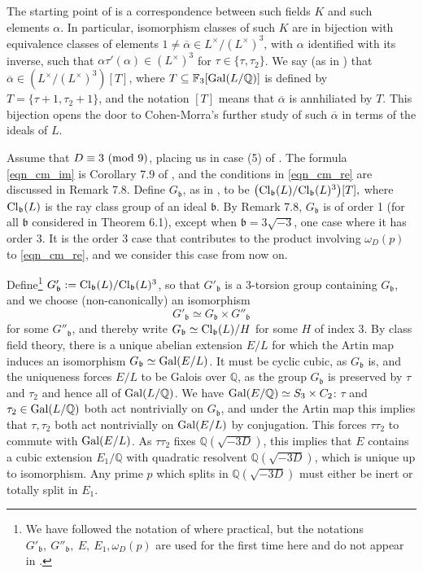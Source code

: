 \documentclass[12pt]{amsart}
\theoremstyle{remark}
\numberwithin{theorem}{section} \numberwithin{equation}{section}
\newcommand{\mfb}{\mathfrak{b}}
\newcommand{\F}{\mathbb{F}}
\newcommand{\Cl}{{\text {\rm Cl}}}
\newcommand{\Q}{\mathbb{Q}}
\newcommand{\textmod}{{\text {\rm mod}}}
\newcommand{\Gal}{{\text {\rm Gal}}}
\begin{document}
The starting point of \cite{CM}
is a correspondence between such fields $K$ and such elements $\alpha$.
In particular, isomorphism classes of such $K$ are in bijection with equivalence classes of elements $1 \neq \overline{\alpha} \in L^{\times}/(L^{\times})^3$,
with $\alpha$ identified with its inverse,
such that $\alpha \tau'(\alpha) \in (L^{\times})^3$ for $\tau \in \{ \tau, \tau_2 \}$. 
We say (as in \cite[Definition 2.3]{CM}) that $\overline{\alpha} \in (L^{\times}/(L^{\times})^3)[T]$, where
$T \subseteq \F_3[\Gal(L/\Q)]$ is defined by $T = \{ \tau + 1, \tau_2 + 1 \}$, and the notation $[T]$ means
that $\overline{\alpha}$ is annhiliated by $T$. This bijection opens the door to Cohen-Morra's
further study of such $\overline{\alpha}$ in terms of the ideals of $L$.

Assume that $D \equiv 3 \ (\textmod \ 9)$, placing us in case (5) of \cite[p. 464]{CM}. The 
formula \eqref{eqn_cm_im} is Corollary 7.9 of \cite{CM}, and the conditions in \eqref{eqn_cm_re} are discussed in
Remark 7.8. Define $G_{\mfb}$, as in \cite[Theorem 6.1]{CM}, to be
$\big(\Cl_{\mfb}(L)/\Cl_{\mfb}(L)^3\big)[T],$ where $\Cl_{\mfb}(L)$ is the ray class group of an ideal $\mfb$.
By Remark 7.8, $G_{\mfb}$ is of order 1 (for all $\mfb$ considered in Theorem 6.1), except when $\mfb = 3\sqrt{-3}$, 
one case where it has order 3. 
It is the order 3 case that contributes to the product involving $\omega_D(p)$ to \eqref{eqn_cm_re}, and we consider
this case from now on.

Define\footnote{We have followed the notation of \cite{CM} where practical, but the notations
$G'_{\mfb}, \ G''_{\mfb}, \ E, \ E_1, \omega_D(p)$ are used for the first time here and do not
appear in \cite{CM}.} $G'_{\mfb} := \Cl_{\mfb}(L)/\Cl_{\mfb}(L)^3$, so that $G'_{\mfb}$ is
a 3-torsion group containing $G_{\mfb}$, and we choose (non-canonically) an isomorphism
\begin{equation}\label{eqn_nci}
G'_{\mfb} \simeq G_{\mfb} \times G''_{\mfb}
\end{equation}
for some $G''_{\mfb}$, and thereby write $G_{\mfb} \simeq \Cl_{\mfb}(L)/H$ for some $H$ of index 3.
By class field theory, there is a unique abelian extension $E/L$ for which the Artin map induces an isomorphism
$G_{\mfb} \simeq \Gal(E/L)$. It must be cyclic cubic, as $G_{\mfb}$ is, and the uniqueness forces $E/L$ to be 
Galois over $\Q$, as the group $G_{\mfb}$ is preserved by $\tau$ and $\tau_2$ and hence all of $\Gal(L/\Q)$.
We have $\Gal(E/\Q) \simeq S_3 \times C_2$: $\tau$ and $\tau_2 \in \Gal(L/\Q)$ both act nontrivially on $G_{\mfb}$,
and under the Artin map this implies that $\tau, \tau_2$ both act  nontrivially on $\Gal(E/L)$ by conjugation. This forces
$\tau \tau_2$ to commute with $\Gal(E/L)$. As $\tau \tau_2$ fixes $\Q(\sqrt{-3D})$, this implies that $E$ contains
a cubic extension $E_1/\Q$ with quadratic
resolvent $\Q(\sqrt{-3D})$, which is unique up to isomorphism. Any prime $p$
which splits in $\Q(\sqrt{-3D})$ must either be inert or totally split in $E_1$.
\end{document}
